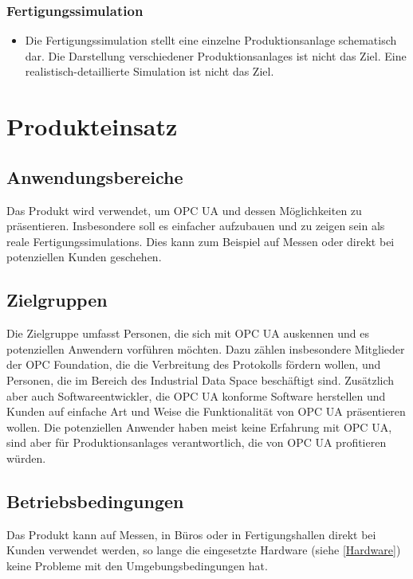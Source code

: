 \documentclass[parskip=full]{scrartcl}
\begin{document}
\subsubsection{Fertigungssimulation}
\begin{itemize}
  \item Die \gls{Fertigungssimulation} stellt eine einzelne \gls{Produktionsanlage} schematisch dar. Die Darstellung verschiedener \glspl{Produktionsanlage}
    ist nicht das Ziel. Eine realistisch-detaillierte Simulation ist nicht das Ziel.
\end{itemize}


\newpage
\section{Produkteinsatz}
\subsection{Anwendungsbereiche}
Das Produkt wird verwendet, um \gls{OPC UA} und dessen Möglichkeiten zu präsentieren.
Insbesondere soll es einfacher aufzubauen und zu zeigen sein als reale \glspl{Fertigungssimulation}.
Dies kann zum Beispiel auf Messen oder direkt bei potenziellen Kunden geschehen.

\subsection{Zielgruppen}
Die Zielgruppe umfasst Personen, die sich mit \gls{OPC UA} auskennen und es potenziellen Anwendern vorführen möchten.
Dazu zählen insbesondere Mitglieder der OPC Foundation, die die Verbreitung des Protokolls fördern wollen, und Personen,
die im Bereich des \gls{Industrial Data Space} beschäftigt sind.
Zusätzlich aber auch Softwareentwickler, die \gls{OPC UA} konforme Software herstellen und Kunden auf einfache Art und
Weise die Funktionalität von \gls{OPC UA} präsentieren wollen.
Die potenziellen Anwender haben meist keine Erfahrung mit \gls{OPC UA}, sind aber für \glspl{Produktionsanlage} verantwortlich,
die von \gls{OPC UA} profitieren würden.

\subsection{Betriebsbedingungen}
Das Produkt kann auf Messen, in Büros oder in Fertigungshallen direkt bei Kunden verwendet werden,
so lange die eingesetzte Hardware (siehe \ref{Hardware}) keine Probleme mit den Umgebungsbedingungen hat.
\end{document}
